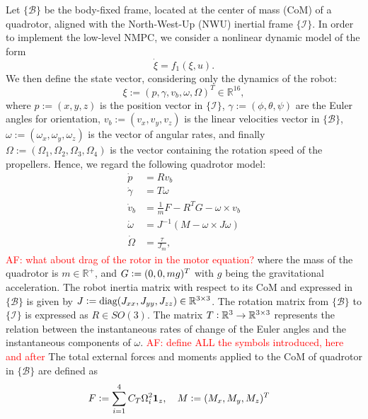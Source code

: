 Let $\{\mathcal{B}\}$ be the body-fixed frame, located at the center of mass (CoM) of a quadrotor, aligned with the North-West-Up (NWU) inertial frame $\{\mathcal{I}\}$. In order to implement the low-level NMPC, we consider a nonlinear dynamic model of the form
\begin{equation*}
	\dot{\xi} = f_1(\xi,u).
\end{equation*}
We then define the state vector, considering only the dynamics of the robot:
\begin{equation*}
	\xi := (p,\gamma,v_b,\omega,\Omega)^T \in \mathbb{R}^{16},
\end{equation*}
where $ p := (x, y, z)$  is the position vector in $\{\mathcal{I}\}$, $ \gamma := (\phi,\theta,\psi)$ are the Euler angles for orientation, $v_b := (v_x, v_y, v_z)$ is the linear velocities vector in $\{\mathcal{B}\}$, $\omega := (\omega_x, \omega_y, \omega_z)$ is the vector of angular rates, and finally $\Omega := (\Omega_1,\Omega_2,\Omega_3,\Omega_4)$ is the vector containing the rotation speed of the propellers. Hence, we regard the following quadrotor model:
 \begin{equation*}
 	\begin{aligned}
 	\dot{p} &= Rv_b \\
 	\dot{\gamma} &= T \omega\\
	\dot{v}_b &= \frac{1}{m}F - R^{T}G - \omega\times v_b\\
	\dot{\omega} &= J^{-1}(M - \omega\times J\omega)\\
	\dot{\Omega} &= \frac{\tau}{J_m},
 	\end{aligned}%
 \end{equation*}
 \textcolor{red}{AF: what about drag of the rotor in the motor equation?}
where the mass of the quadrotor is $m \in \mathbb{R}^+$, and $G \vcentcolon =(0, 0, mg)^T$ with $g$ being the gravitational acceleration. The robot inertia matrix with respect to its CoM and expressed in $\{\mathcal{B}\}$ is given by $J \vcentcolon = \text{diag}(J_{xx}, J_{yy}, J_{zz}) \in \mathbb{R}^{3 \times 3}$. The rotation matrix from  $\{\mathcal{B}\}$ to $\{\mathcal{I}\}$ is expressed as $R \in SO(3)$. The matrix $T \vcentcolon \mathbb{R}^3 \rightarrow \mathbb{R}^{3 \times 3}$ represents the relation between the instantaneous rates of change of the Euler angles and the instantaneous components of $\omega$. \textcolor{red}{AF: define ALL the symbols introduced, here and after} The total external forces and moments applied to the CoM of quadrotor in $\{\mathcal{B}\}$ are defined as 
 \begin{equation}
 	\begin{aligned}
    F & \vcentcolon =  \sum_{i=1}^4 C_T\Omega_{i}^2\mathbf{1}_z, \quad M \vcentcolon = (M_x, M_y, M_z)^T
	\end{aligned}
 \end{equation}\label{eq:force_moments}
